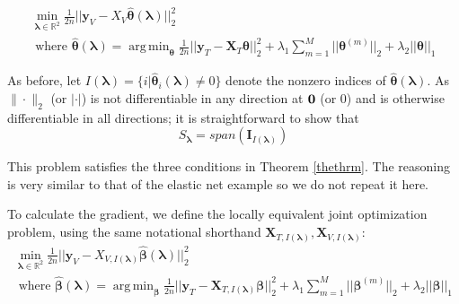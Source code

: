\documentclass[10pt,letterpaper]{article}
\DeclareMathOperator*{\argmin}{arg\,min}
\begin{document}
\begin{equation}
\begin{array}{c}
\min_{\boldsymbol{\lambda} \in \mathbb{R}^2} \frac{1}{2n} \bigl\lvert\bigl\lvert \boldsymbol{y}_V - X_V \hat{\boldsymbol{\theta}}(\boldsymbol{\lambda}) \bigl\rvert\bigl\rvert^2_2 \\
\text{ where }
\hat{\boldsymbol{\theta}}(\boldsymbol{\lambda}) = \argmin_{\boldsymbol{\theta}} \frac{1}{2n} \bigl\lvert\bigl\lvert \boldsymbol{y}_T - \boldsymbol{X}_T \boldsymbol{\theta} \bigl\rvert\bigl\rvert^2_2
+ \lambda_1 \sum_{m=1}^M \lvert\lvert \boldsymbol\theta^{(m)} \rvert \rvert_2
+ \lambda_2 \lvert\lvert \boldsymbol\theta \rvert \rvert_1
\end{array}
\end{equation}

As before, let $I(\boldsymbol\lambda) = \{i | \hat{\boldsymbol{\theta}}_i(\boldsymbol\lambda) \ne 0\}$ denote the nonzero indices of $\hat{\boldsymbol{\theta}}(\boldsymbol{\lambda})$. As $\|\cdot\|_2$ (or $|\cdot|$) is not differentiable in any direction at ${\bf 0}$ (or $0$) and is otherwise differentiable in all directions; it is straightforward to show that 
\begin{equation}
S_{\boldsymbol \lambda} = span(\boldsymbol I_{I(\boldsymbol\lambda)})
\end{equation}

This problem satisfies the three conditions in Theorem \ref{thethrm}. The reasoning is very similar to that of the elastic net example so we do not repeat it here.

To calculate the gradient, we define the locally equivalent joint optimization problem, using the same notational shorthand $\boldsymbol{X}_{T, I(\boldsymbol\lambda)}, \boldsymbol{X}_{V, I(\boldsymbol\lambda)}$:
\begin{equation}
\begin{array}{c}
\min_{\boldsymbol{\lambda} \in \mathbb{R}^2} \frac{1}{2n} \bigl\lvert\bigl\lvert \boldsymbol{y}_V - X_{V,I(\boldsymbol\lambda)} \hat{\boldsymbol\beta}(\boldsymbol{\lambda}) \bigl\rvert\bigl\rvert^2_2 \\
\text{ where }
\hat{\boldsymbol{\beta}}(\boldsymbol{\lambda}) = \argmin_{\boldsymbol \beta}
\frac{1}{2n} \bigl\lvert\bigl\lvert \boldsymbol{y}_T - \boldsymbol{X}_{T, I(\boldsymbol\lambda)} \boldsymbol \beta \bigl\rvert\bigl\rvert^2_2
+ \lambda_1 \sum_{m=1}^M \lvert\lvert \boldsymbol \beta^{(m)} \rvert \rvert_2
+ \lambda_2 \lvert\lvert \boldsymbol \beta \rvert \rvert_1
\end{array}
\end{equation}
\end{document}
